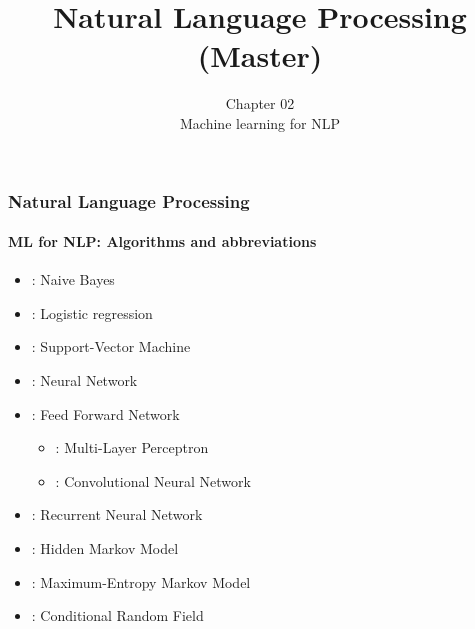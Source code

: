 \documentclass[xcolor=table]{beamer}
\title[ESI - NLP(master)]%
{Natural Language Processing (Master)}
\subtitle[02- ML for NLP]%
{Chapter 02\\Machine learning for NLP}
\begin{document}
	
%		
%		
	
	\begin{frame}
		\frametitle{Natural Language Processing}
		\framesubtitle{ML for NLP: Algorithms and abbreviations}
		
		\begin{itemize}
			\item {}: Naive Bayes
			\item {}: Logistic regression
			\item {}: Support-Vector Machine
			\item {}: Neural Network
			\item {}: Feed Forward Network
			\begin{itemize}
				\item {}: Multi-Layer Perceptron
				\item {}: Convolutional Neural Network
			\end{itemize}
			\item {}: Recurrent Neural Network
			\item {}: Hidden Markov Model
			\item {}: Maximum-Entropy Markov Model
			\item {}: Conditional Random Field
		\end{itemize}
		
	\end{frame}
	
\end{document}
